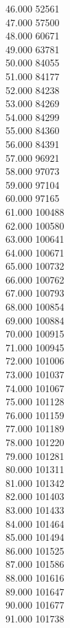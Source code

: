 { 46.000	52561 \\
 47.000	57500 \\
 48.000	60671 \\
 49.000	63781 \\
 50.000	84055 \\
 51.000	84177 \\
 52.000	84238 \\
 53.000	84269 \\
 54.000	84299 \\
 55.000	84360 \\
 56.000	84391 \\
 57.000	96921 \\
 58.000	97073 \\
 59.000	97104 \\
 60.000	97165 \\
 61.000	100488 \\
 62.000	100580 \\
 63.000	100641 \\
 64.000	100671 \\
 65.000	100732 \\
 66.000	100762 \\
 67.000	100793 \\
 68.000	100854 \\
 69.000	100884 \\
 70.000	100915 \\
 71.000	100945 \\
 72.000	101006 \\
 73.000	101037 \\
 74.000	101067 \\
 75.000	101128 \\
 76.000	101159 \\
 77.000	101189 \\
 78.000	101220 \\
 79.000	101281 \\
 80.000	101311 \\
 81.000	101342 \\
 82.000	101403 \\
 83.000	101433 \\
 84.000	101464 \\
 85.000	101494 \\
 86.000	101525 \\
 87.000	101586 \\
 88.000	101616 \\
 89.000	101647 \\
 90.000	101677 \\
 91.000	101738 \\
}
